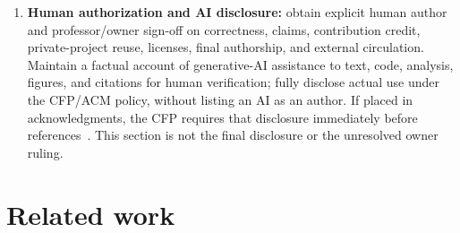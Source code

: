 \documentclass[11pt]{article}
\begin{document}
\begin{enumerate}
  Prepare a separately identified, permission-cleared release. Public archival
  deposit with a persistent DOI is our eventual release gate; Git hosting alone
  does not qualify for the venue's ``artifacts available'' badge. Formal AE is
  voluntary, follows paper acceptance, and does not determine it; its
  camera-ready appendix is at most two pages~\cite{asplos2027ae}. Anonymous
  submission access and later public archival access are distinct stages.
\item \textbf{Human authorization and AI disclosure:} obtain explicit human
  author and professor/owner sign-off on correctness, claims, contribution
  credit, private-project reuse, licenses, final authorship, and external
  circulation. Maintain a factual account of generative-AI assistance to
  text, code, analysis, figures, and citations for human verification; fully
  disclose actual use under the CFP/ACM policy, without listing an AI as an
  author. If placed in acknowledgments, the CFP requires that disclosure
  immediately before references~\cite{asplos2027cfp}. This section is not the
  final disclosure or the unresolved owner ruling.
\end{enumerate}

\section{Related work}
\label{sec:related}
\end{document}
